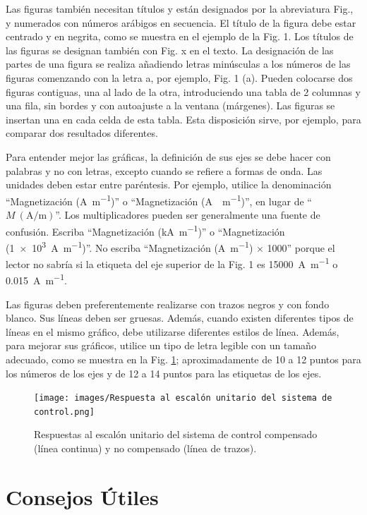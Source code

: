\documentclass[a4paper, 12pt]{article}
\begin{document}
Las figuras también necesitan títulos y están designados por la abreviatura Fig., y numerados con números arábigos en secuencia. El título de la figura debe estar centrado y en negrita, como se muestra en el ejemplo de la Fig. 1. Los títulos de las figuras se designan también con Fig. x en el texto. La designación de las partes de una figura se realiza añadiendo letras minúsculas a los números de las figuras comenzando con la letra a, por ejemplo, Fig. 1 (a). Pueden colocarse dos figuras contiguas, una al lado de la otra, introduciendo una tabla de 2 columnas y una fila, sin bordes y con autoajuste a la ventana (márgenes). Las figuras se insertan una en cada celda de esta tabla. Esta disposición sirve, por ejemplo, para comparar dos resultados diferentes.

Para entender mejor las gráficas, la definición de sus ejes se debe hacer con palabras y no con letras, excepto cuando se refiere a formas de onda. Las unidades deben estar entre paréntesis. Por ejemplo, utilice la denominación “Magnetización (\si{\ampere\per\meter})” o “Magnetización (\si{\ampere\cdot\meter^{-1}})”, en lugar de “\( M~(\si{\ampere\per\meter}) \)”. Los multiplicadores pueden ser generalmente una fuente de confusión. Escriba “Magnetización (\si{\kilo\ampere\per\meter})” o “Magnetización (\SI{1e3}{\ampere\per\meter})”. No escriba “Magnetización (\si{\ampere\per\meter}) × 1000” porque el lector no sabría si la etiqueta del eje superior de la Fig. 1 es \SI{15000}{\ampere\per\meter} o \SI{0.015}{\ampere\per\meter}.

Las figuras deben preferentemente realizarse con trazos negros y con fondo blanco. Sus líneas deben ser gruesas. Además, cuando existen diferentes tipos de líneas en el mismo gráfico, debe utilizarse diferentes estilos de línea. Además, para mejorar sus gráficos, utilice un tipo de letra legible con un tamaño adecuado, como se muestra en la Fig. \ref{fig:fig2}; aproximadamente de 10 a 12 puntos para los números de los ejes y de 12 a 14 puntos para las etiquetas de los ejes.

\begin{figure}[h!]
    \centering
    \texttt{[image: images/Respuesta al escalón unitario del sistema de control.png]}
    \caption{Respuestas al escalón unitario del sistema de control compensado (línea continua) y no compensado (línea de trazos).}
    \label{fig:fig2}
\end{figure}


\section{Consejos Útiles}
\end{document}
